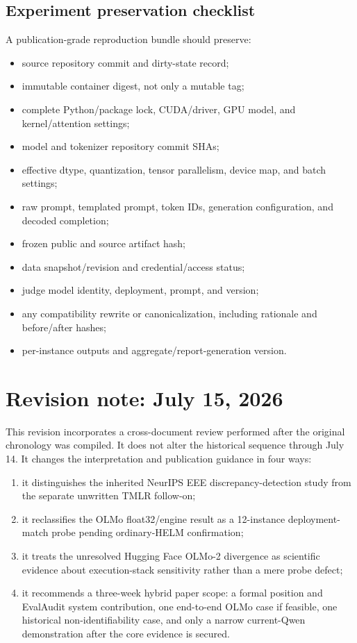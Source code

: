 \documentclass[11pt,oneside]{report}
\newcommand{\code}[1]{\texttt{\detokenize{#1}}}
\begin{document}
\section{Experiment preservation checklist}

A publication-grade reproduction bundle should preserve:

\begin{itemize}
  \item source repository commit and dirty-state record;
  \item immutable container digest, not only a mutable tag;
  \item complete Python/package lock, CUDA/driver, GPU model, and kernel/attention settings;
  \item model and tokenizer repository commit SHAs;
  \item effective dtype, quantization, tensor parallelism, device map, and batch settings;
  \item raw prompt, templated prompt, token IDs, generation configuration, and decoded completion;
  \item frozen public \code{run_spec.json} and source artifact hash;
  \item data snapshot/revision and credential/access status;
  \item judge model identity, deployment, prompt, and version;
  \item any compatibility rewrite or canonicalization, including rationale and before/after hashes;
  \item per-instance outputs and aggregate/report-generation version.
\end{itemize}


\chapter{Revision note: July 15, 2026}

This revision incorporates a cross-document review performed after the original chronology was compiled. It does not alter the historical sequence through July 14. It changes the interpretation and publication guidance in four ways:

\begin{enumerate}
  \item it distinguishes the inherited NeurIPS EEE discrepancy-detection study from the separate unwritten TMLR follow-on;
  \item it reclassifies the OLMo float32/engine result as a 12-instance deployment-match probe pending ordinary-HELM confirmation;
  \item it treats the unresolved Hugging Face OLMo-2 divergence as scientific evidence about execution-stack sensitivity rather than a mere probe defect;
  \item it recommends a three-week hybrid paper scope: a formal position and EvalAudit system contribution, one end-to-end OLMo case if feasible, one historical non-identifiability case, and only a narrow current-Qwen demonstration after the core evidence is secured.
\end{enumerate}
\end{document}
